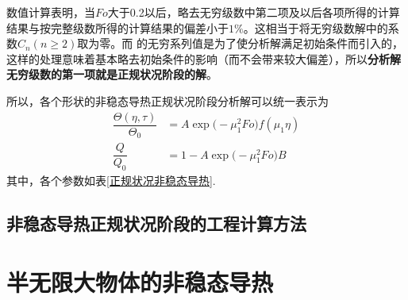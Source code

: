 数值计算表明，当$Fo$大于0.2以后，略去无穷级数中第二项及以后各项所得的计算结果与按完整级数所得的计算结果的偏差小于$1\%$。这相当于将无穷级数解中的系数$C_n(n \ge 2)$取为零。而   的无穷系列值是为了使分析解满足初始条件而引入的，这样的处理意味着基本略去初始条件的影响（而不会带来较大偏差），所以\textbf{分析解无穷级数的第一项就是正规状况阶段的解}。

所以，各个形状的非稳态导热正规状况阶段分析解可以统一表示为
\begin{align}
	\dfrac{\Theta(\eta, \tau)}{\Theta_0} &= A\exp\big(-\mu_1^2 Fo\big) f(\mu_1 \eta)\\[0.5em]
	\dfrac{Q}{Q_0} &= 1 - A\exp\big(-\mu_1^2Fo\big)B
\end{align}
其中，各个参数如表\ref{正规状况非稳态导热}.
\begin{table}[!htb]
	\centering{}
\end{table}

\subsection{非稳态导热正规状况阶段的工程计算方法}

\section{半无限大物体的非稳态导热}
